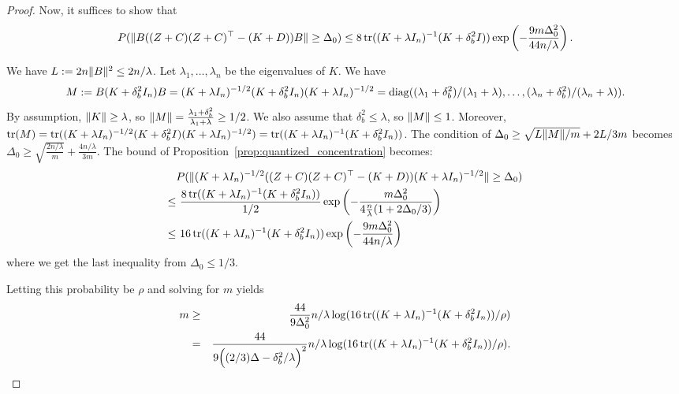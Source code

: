\begin{proof}
Now, it suffices to show that
\begin{equation*}
P(\|B((Z + C)(Z + C)^\top - (K + D))B\| \geq \Delta_0) \leq 8 \mathop{\rm tr}((K + \lambda I_n)^{-1} (K +
\delta^2_b I)) \exp \left( -\frac{9m \Delta_0^2}{44n/\lambda} \right).
\end{equation*}

We have $L := 2n \|B\|^2 \leq 2n/\lambda$.
Let $\lambda_1, \dots, \lambda_n$ be the eigenvalues of $K$.
We have
\begin{equation*}
M \defeq B(K + \delta^2_b I_n) B =  (K + \lambda I_n)^{-1/2} (K + \delta^2_b I_n) (K + \lambda
I_n)^{-1/2} = \diag((\lambda_1 + \delta^2_b)/(\lambda_1 + \lambda), \dots,
(\lambda_n + \delta^2_b) / (\lambda_n + \lambda)).
\end{equation*}
By assumption, $\|K\| \geq \lambda$, so $\|M\| = \frac{\lambda_1 + \delta^2_b}{\lambda_1 + \lambda} \geq
1/2$.
We also assume that $\delta^2_b \leq \lambda$, so $\|M\| \leq 1$.
Moreover, $\mathop{\rm tr}(M) = \mathop{\rm tr}((K + \lambda I_n)^{-1/2} (K + \delta^2_b I) (K + \lambda I_n)^{-1/2}) =
\mathop{\rm tr}((K + \lambda I_n)^{-1} (K + \delta^2_b I_n))$.
The condition of $\Delta_0 \geq \sqrt{L \|M\| / m} + 2L/3m$ becomes $\Delta_0 \geq \sqrt{\frac{2n/\lambda}{m}} + \frac{4n/\lambda}{3m}$.
The bound of Proposition~\ref{prop:quantized_concentration} becomes:
\begin{align*}
&P(\|(K + \lambda I_n)^{-1/2} ((Z + C) (Z + C)^\top - (K + D)) (K + \lambda
  I_n)^{-1/2}\| \geq \Delta_0) \\
\leq&\ \frac{8 \mathop{\rm tr}((K + \lambda I_n)^{-1} (K + \delta^2_b I_n))}{1/2} \exp \left( -\frac{m
  \Delta_0^2}{4\frac{n}{\lambda} (1 + 2\Delta_0/3)} \right) \\
\leq&\ 16 \mathop{\rm tr}((K + \lambda I_n)^{-1} (K + \delta^2_b I_n)) \exp \left( -\frac{9m\Delta_0^2}{44n/\lambda} \right)
\end{align*}
where we get the last inequality from $\Delta_0 \leq 1/3$.

Letting this probability be $\rho$ and solving for $m$ yields
\begin{eqnarray*}
m &\geq& \frac{44}{9 \Delta_0^2} n/\lambda \log (16 \mathop{\rm tr}((K + \lambda I_n)^{-1} (K + \delta^2_b I_n)) / \rho) \\
&=& \frac{44}{9 \Big((2/3)\Delta - \delta_b^2/\lambda\Big)^2} n/\lambda \log (16 \mathop{\rm tr}((K + \lambda I_n)^{-1} (K + \delta^2_b I_n)) / \rho).
\end{eqnarray*}

\end{proof}

